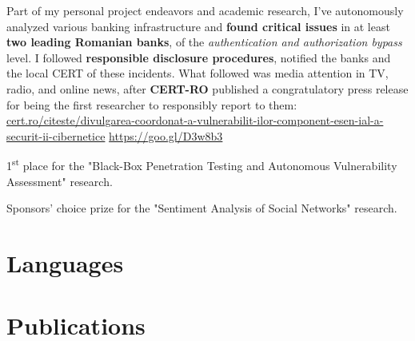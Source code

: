 \documentclass[11pt,a4paper,sans]{moderncv}
\renewcommand*{\httplink}[2][]{%
	\ifthenelse{\equal{#1}{}}%
	{\href{https://#2}{#2}}%
	{\href{https://#2}{#1}}}
\begin{document}
	\vspace{-2pt} {\small{Part of my personal project endeavors and academic research, I've autonomously analyzed various banking infrastructure and \textbf{found critical issues} in at least \textbf{two leading Romanian banks}, of the \textit{authentication and authorization bypass} level. I followed \textbf{responsible disclosure procedures}, notified the banks and the local CERT of these incidents. What followed was media attention in TV, radio, and online news, after \textbf{CERT-RO} published a congratulatory press release for being the first researcher to responsibly report to them: \httplink[https://goo.gl/D3w8b3]{cert.ro/citeste/divulgarea-coordonat-a-vulnerabilit-ilor-component-esen-ial-a-securit-ii-cibernetice}}}

	\vspace{4pt}

	\vspace{-2pt} {\small{1\textsuperscript{st} place for the "Black-Box Penetration Testing and Autonomous Vulnerability Assessment" research.}}

	\vspace{4pt}

	\vspace{-2pt} {\small{Sponsors' choice prize for the "Sentiment Analysis of Social Networks" research.}}


\fancyfoot[L]{\textcolor{color2}{\phonesymbol \myphone {~~~{\rmfamily\textbullet}~~~} \emailsymbol\emaillink{\myemail} {~~~{\rmfamily\textbullet}~~~} \homepagesymbol\httplink{\myhomepage}}}


\section{Languages}


\section{Publications}

\end{document}
